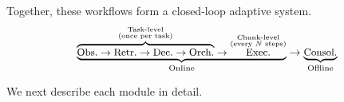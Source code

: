 Together, these workflows form a closed-loop adaptive system.
\vspace{-0.5em}
\[\small
\underbrace{
    \overbrace{\text{Obs.} \rightarrow \text{Retr.} \rightarrow \text{Dec.} \rightarrow \text{Orch.}}^{\substack{\text{Task-level} \\ (\text{once per task})}} \rightarrow \overset{\substack{\text{Chunk-level} \\ (\text{every } N \text{ steps})}}{\text{Exec.}}
}_{\text{Online}} 
\rightarrow 
\underbrace{\text{Consol.}}_{\text{Offline}}
\]

We next describe each module in detail.







